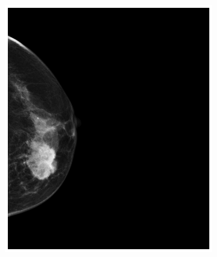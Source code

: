 \documentclass[a4paper,10pt]{book}
\begin{document}
\begin{figure}[h!]
\centering
\begin{subfigure}[t]{0.35\textwidth}
\centering
\includegraphics[width=\textwidth]{reports//assets/preprocess_a.png}
\caption{}
\label{fig:pre_original}
\end{subfigure}
\begin{subfigure}[t]{0.15\textwidth}
\centering

\end{subfigure}
\end{figure}
\end{document}
